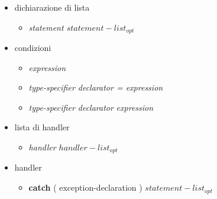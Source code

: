 \documentclass[11pt,a4paper]{book}
\begin{document}
\begin{itemize}
	\item dichiarazione di lista
	\begin{itemize}
		\item \textit{statement $statement-list_{opt}$}
	\end{itemize}
	
	\item condizioni
	\begin{itemize}
		\item \textit{expression}
		\item \textit{type-specifier declarator = expression}
		\item \textit{type-specifier declarator} { \textit{expression} }
	\end{itemize}
	
	\item lista di handler
	\begin{itemize}
		\item \textit{handler $handler-list_{opt}$}
	\end{itemize}
	
	\item handler
	\begin{itemize}
		\item \textbf{catch} ( exception-declaration ) { \textit{$statement-list_{opt}$}}
	\end{itemize}
\end{itemize}
\end{document}
